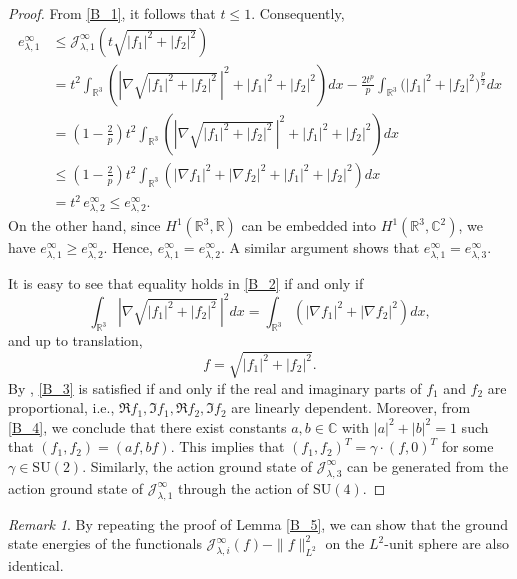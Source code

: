 \documentclass{amsart}
\theoremstyle{plain}
\theoremstyle{definition}
\theoremstyle{remark}
\newtheorem*{rem*}{Remark}
\numberwithin{equation}{section} \numberwithin{figure}{section}
\begin{document}
\begin{proof}
From \eqref{B_1}, it follows that $t \leq 1$. Consequently,
\begin{equation}\label{B_2}
    \begin{split}
        e^\infty_{\lambda,1} 
&\leq \mathcal{J}^\infty_{\lambda,1} \left( t \sqrt{|f_1|^2 + |f_2|^2} \right) \\
&= t^2 \int_{\mathbb{R}^3} \left( \left| \nabla \sqrt{|f_1|^2 + |f_2|^2} \,\right|^2 + |f_1|^2 + |f_2|^2 \right) dx - \frac{2t^p}{p} \int_{\mathbb{R}^3} \big( |f_1|^2 + |f_2|^2 \big)^{\frac{p}{2}} dx \\
&= \left( 1 - \frac{2}{p} \right) t^2 \int_{\mathbb{R}^3} \left( \left| \nabla \sqrt{|f_1|^2 + |f_2|^2} \,\right|^2 + |f_1|^2 + |f_2|^2 \right) dx \\
&\leq \left( 1 - \frac{2}{p} \right) t^2 \int_{\mathbb{R}^3} \left( |\nabla f_1|^2 + |\nabla f_2|^2 + |f_1|^2 + |f_2|^2 \right) dx \\
&= t^2 \, e^\infty_{\lambda,2} \leq e^\infty_{\lambda,2}.
    \end{split}
\end{equation}
On the other hand, since $H^1(\mathbb{R}^3, \mathbb{R})$ can be embedded into $H^1(\mathbb{R}^3, \mathbb{C}^2)$, we have $e^\infty_{\lambda,1} \geq e^\infty_{\lambda,2}$. Hence, $e^\infty_{\lambda,1} = e^\infty_{\lambda,2}$. A similar argument shows that $e^\infty_{\lambda,1} = e^\infty_{\lambda,3}$.

It is easy to see that equality holds in \eqref{B_2} if and only if 
\begin{equation}\label{B_3}
    \int_{\mathbb{R}^3} \left| \nabla \sqrt{|f_1|^2 + |f_2|^2} \,\right|^2 dx = \int_{\mathbb{R}^3} \left( |\nabla f_1|^2 + |\nabla f_2|^2 \right) dx,
\end{equation}
 and up to translation,
 \begin{equation}\label{B_4}
     f= \sqrt{|f_1|^2+ |f_2|^2}.
 \end{equation}
By \cite[Theorem 6.17]{MR1817225}, \eqref{B_3} is satisfied if and only if the real and imaginary parts of \( f_1 \) and \( f_2 \) are proportional, i.e., \(\Re f_1, \Im f_1, \Re f_2, \Im f_2\) are linearly dependent. Moreover, from \eqref{B_4}, we conclude that there exist constants \( a, b \in \mathbb{C} \) with \( |a|^2 + |b|^2 = 1 \) such that \( (f_1, f_2) = (a f, b f) \). This implies that \( (f_1, f_2)^T = \gamma \cdot (f, 0)^T \) for some \( \gamma \in \mathrm{SU}(2) \). Similarly, the action ground state of \( \mathcal{J}^\infty_{\lambda, 3} \) can be generated from the action ground state of \( \mathcal{J}^\infty_{\lambda, 1} \) through the action of \( \mathrm{SU}(4) \).
\end{proof}
\begin{rem*}
    By repeating the proof of Lemma \ref{B_5}, we can show that the ground state energies of the functionals \( \mathcal{J}^\infty_{\lambda, i}(f) - \|f\|_{L^2}^2 \) on the \( L^2 \)-unit sphere are also identical.
\end{rem*}
\end{document}
